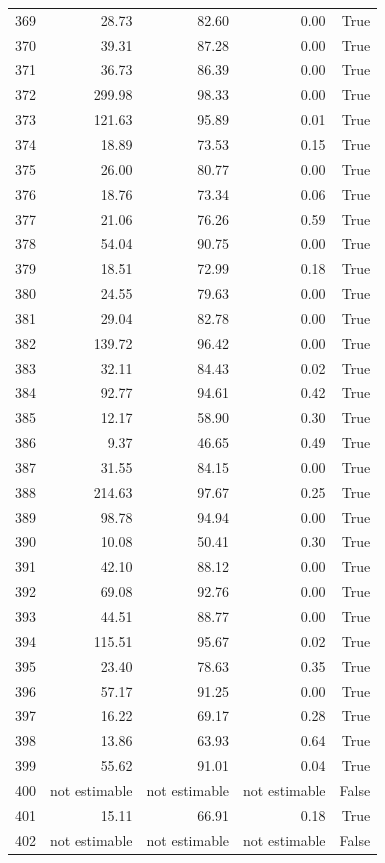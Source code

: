 \begin{longtable}{rrrrr}
369 & 28.73 & 82.60 & 0.00 & True \\
370 & 39.31 & 87.28 & 0.00 & True \\
371 & 36.73 & 86.39 & 0.00 & True \\
372 & 299.98 & 98.33 & 0.00 & True \\
373 & 121.63 & 95.89 & 0.01 & True \\
374 & 18.89 & 73.53 & 0.15 & True \\
375 & 26.00 & 80.77 & 0.00 & True \\
376 & 18.76 & 73.34 & 0.06 & True \\
377 & 21.06 & 76.26 & 0.59 & True \\
378 & 54.04 & 90.75 & 0.00 & True \\
379 & 18.51 & 72.99 & 0.18 & True \\
380 & 24.55 & 79.63 & 0.00 & True \\
381 & 29.04 & 82.78 & 0.00 & True \\
382 & 139.72 & 96.42 & 0.00 & True \\
383 & 32.11 & 84.43 & 0.02 & True \\
384 & 92.77 & 94.61 & 0.42 & True \\
385 & 12.17 & 58.90 & 0.30 & True \\
386 & 9.37 & 46.65 & 0.49 & True \\
387 & 31.55 & 84.15 & 0.00 & True \\
388 & 214.63 & 97.67 & 0.25 & True \\
389 & 98.78 & 94.94 & 0.00 & True \\
390 & 10.08 & 50.41 & 0.30 & True \\
391 & 42.10 & 88.12 & 0.00 & True \\
392 & 69.08 & 92.76 & 0.00 & True \\
393 & 44.51 & 88.77 & 0.00 & True \\
394 & 115.51 & 95.67 & 0.02 & True \\
395 & 23.40 & 78.63 & 0.35 & True \\
396 & 57.17 & 91.25 & 0.00 & True \\
397 & 16.22 & 69.17 & 0.28 & True \\
398 & 13.86 & 63.93 & 0.64 & True \\
399 & 55.62 & 91.01 & 0.04 & True \\
400 & not estimable & not estimable & not estimable & False \\
401 & 15.11 & 66.91 & 0.18 & True \\
402 & not estimable & not estimable & not estimable & False \\

\end{longtable}

